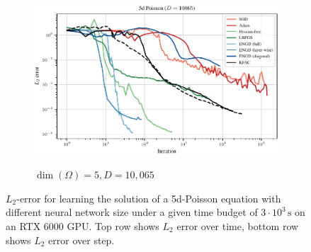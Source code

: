 \begin{figure}[!h]
\begin{subfigure}{0.325\linewidth}
    \\
    \includegraphics[width=\linewidth]{../kfac_pinns_exp/exp16_poisson5d_deepwide/l2_error_over_step}
    \caption{$\dim(\Omega) = 5, D = 10,065$}
  \end{subfigure}
  \caption{$L_2$-error for learning the solution of a 5d-Poisson equation with different neural network size under a given time budget of $3\cdot 10^3\,\text{s}$ on an RTX 6000 GPU.
    Top row shows $L_2$ error over time, bottom row shows $L_2$ error over step.
    }
\end{figure}

